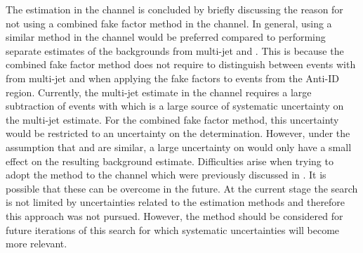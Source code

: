 The \faketauhadvis estimation in the \lephad channel is concluded by
briefly discussing the reason for not using a combined fake factor
method in the \hadhad channel. In general, using a similar method in
the \hadhad channel would be preferred compared to performing separate
estimates of the \faketauhadvis backgrounds from multi-jet and \ttbar.
This is because the combined fake factor method does not require to
distinguish between events with \faketauhadvis from multi-jet and
\ttbar when applying the fake factors to events from the Anti-ID
region. Currently, the multi-jet estimate in the \hadhad channel
requires a large subtraction of \ttbar events with \faketauhadvis
which is a large source of systematic uncertainty on the multi-jet
estimate. For the combined fake factor method, this uncertainty would
be restricted to an uncertainty on the \rqcd determination. However,
under the assumption that \FFqcd and \FFttbar are similar, a large
uncertainty on \rqcd would only have a small effect on the resulting
\faketauhadvis background estimate. Difficulties arise when trying to
adopt the method to the \hadhad channel which were previously
discussed in . It is possible that
these can be overcome in the future. At the current stage the search
is not limited by uncertainties related to the \faketauhadvis
estimation methods and therefore this approach was not
pursued. However, the method should be considered for future
iterations of this search for which systematic uncertainties will
become more relevant.

